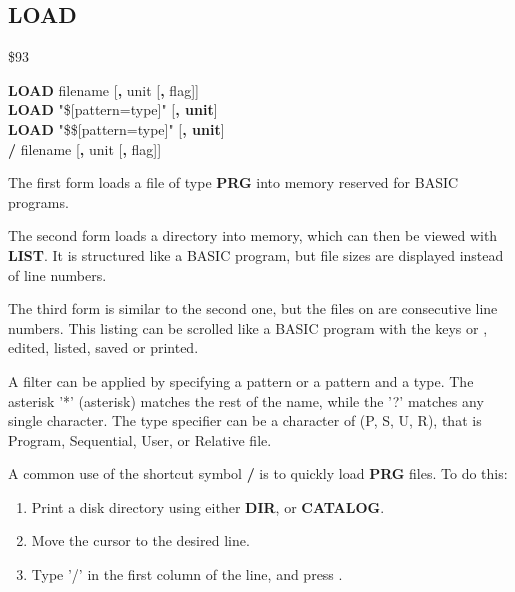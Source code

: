 
\newpage
\subsection{LOAD}
\begin{description}[leftmargin=2cm,style=nextline]
\item [Token:]    \$93

\item [Format:]   {\bf LOAD} filename [{\bf,} unit [{\bf,} flag]] \\
                  {\bf LOAD} "\$[pattern=type]" [{\bf, unit}] \\
                  {\bf LOAD} "\$\$[pattern=type]" [{\bf, unit}] \\
                  {\bf /} filename [{\bf,} unit [{\bf,} flag]]

\item [Usage:]    The first form loads a file of type {\bf PRG} into memory reserved for BASIC programs.

                  The second form loads a directory into memory, which can then be viewed with {\bf LIST}. It is structured like a BASIC program, but file sizes are displayed instead of line numbers.

                  The third form is similar to the second one, but the files on are consecutive line numbers. This listing can be scrolled like a BASIC program with the keys  or , edited, listed, saved or printed.

                  A filter can be applied by specifying a pattern or a pattern and a type. The asterisk '*' (asterisk) matches the rest of the name, while the '?' matches any single character. The type specifier can be a character of (P, S, U, R), that is Program, Sequential, User, or Relative file.

                  A common use of the shortcut symbol {\bf /} is to quickly load {\bf PRG} files. To do this:

                  \begin{enumerate}
                     \item Print a disk directory using either {\bf DIR}, or {\bf CATALOG}.
                     \item Move the cursor to the desired line.
                     \item Type '/' in the first column of the line, and press .
                  \end{enumerate}


\end{description}
